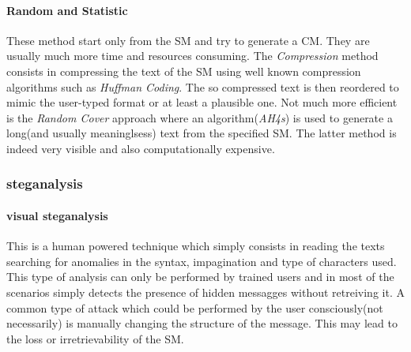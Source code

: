\documentclass[../../main.tex]{subfiles}
\begin{document}
    \paragraph{Random and Statistic}
    These method start only from the SM and try to generate a CM.
    They are usually much more time and resources consuming.
    The \emph{Compression} method consists in compressing the text of the SM
    using well known compression algorithms such as \emph{Huffman Coding}.
    The so compressed text is then reordered to mimic the user-typed format or
    at least a plausible one.
    Not much more efficient is the \emph{Random Cover} approach where an
    algorithm(\emph{AH4s}) is used to generate a long(and usually meaninglsess)
    text from the specified SM.
    The latter method is indeed very visible and also computationally expensive.

    \subsubsection{steganalysis}

    \paragraph{visual steganalysis}
    This is a human powered technique which simply consists in reading the texts
    searching for anomalies in the syntax, impagination and type of characters
    used.
    This type of analysis can only be performed by trained users and in most of
    the scenarios simply detects the presence of hidden messagges without
    retreiving it.
    A common type of attack which could be performed by the user consciously(not
    necessarily) is manually changing the structure of the message.
    This may lead to the loss or irretrievability of the SM.
\end{document}
